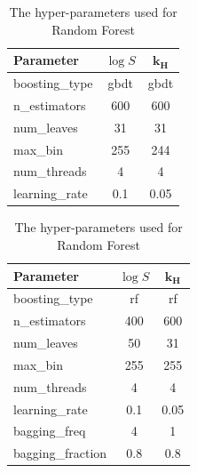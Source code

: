 \documentclass[11pt, titlepage]{article}
\begin{document}
\begin{table}[H]
	\begin{minipage}{.5\linewidth}
		\centering\small
		\begin{tabular}{|l|c|c|}
			\hline
			\textbf{Parameter} & $\log S$ & $\mathbf{k_H}$ \\
			\hline
			boosting\_type & gbdt & gbdt \\
			n\_estimators & 600 & 600 \\
			num\_leaves & 31 & 31 \\
			max\_bin & 255 & 244 \\
			num\_threads & 4 & 4 \\
			learning\_rate & 0.1 & 0.05 \\
			\hline
		\end{tabular}
		\caption{The hyper-parameters used for LightGBM Regressor}
		\label{tab:LGBM_params}
	\end{minipage}
	\begin{minipage}{.5\linewidth}
		\centering\small
		\begin{tabular}{|l|c|c|}
			\hline
			\textbf{Parameter} & $\log S$ & $\mathbf{k_H}$ \\
			\hline
			boosting\_type & rf & rf \\
			n\_estimators & 400 & 600 \\
			num\_leaves & 50 & 31 \\
			max\_bin & 255 & 255 \\
			num\_threads & 4 & 4 \\
			learning\_rate & 0.1 & 0.05 \\
			bagging\_freq & 4 & 1 \\
			bagging\_fraction & 0.8 & 0.8 \\
			\hline
		\end{tabular}
		\caption{The hyper-parameters used for Random Forest}
		\label{tab:rf_params}
	\end{minipage}
\end{table}
\end{document}
